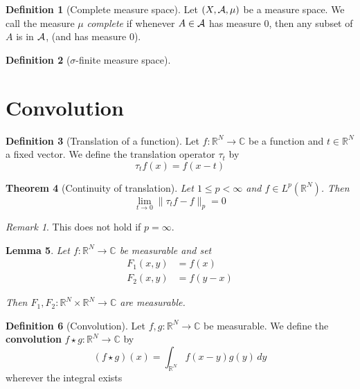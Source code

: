 \documentclass[10pt, oneside, reqno]{amsart}
\theoremstyle{plain}%
\newtheorem{thm}{Theorem}[section]
\newtheorem{lem}[thm]{Lemma}
\theoremstyle{definition}
\newtheorem{defn}[thm]{Definition}
\theoremstyle{remark}
\newtheorem*{rem}{Remark}
\newcommand{\R}{\mathbb{R}}
\newcommand{\Com}{\mathbb{C}}
\begin{document}
\begin{defn}[Complete measure space]
	Let $(X,\mathcal{A}, \mu)$ be a measure space.  We call the measure $\mu$ \emph{complete} if whenever $A \in \mathcal{A}$ has measure $0$, then any subset of $A$ is in $\mathcal{A}$, (and has measure 0).
\end{defn}
\begin{defn}[$\sigma$-finite measure space]
	
\end{defn}









\section{Convolution} %
\label{sec:convolution}


\begin{defn}[Translation of a function]
 	Let $f: \R^N \rightarrow \Com$ be a function and $t \in \R^N$ a fixed vector. We define the translation operator $\tau_t$ by \[
 		\tau_t f(x) = f(x-t)
 	\]
\end{defn}

\begin{thm}[Continuity of translation]
	Let $1 \leq p < \infty$ and $f \in L^p(\R^N)$.  Then \[
		\lim_{t \rightarrow 0} \| \tau_t f - f \|_p = 0
	\]
\end{thm}
\begin{rem}
	This does not hold if $p = \infty$.
\end{rem}

\begin{lem}
	Let $f : \R^N \rightarrow \Com$ be measurable and set 
	\begin{align*}
		F_1(x,y) &= f(x) \\
		F_2(x,y) &= f(y-x)
	\end{align*}
	
	Then $F_1, F_2 : \R^N \times \R^N \rightarrow \Com$ are measurable.
\end{lem}

\begin{defn}[Convolution]
	Let $f,g : \R^N \rightarrow \Com$ be measurable.  We define the \textbf{convolution} $f \star g : \R^N \rightarrow \Com$ by \[
		(f \star g) (x) = \int_{\R^N} f(x-y) g(y) \, dy
	\]
	wherever the integral exists
\end{defn}
\end{document}
